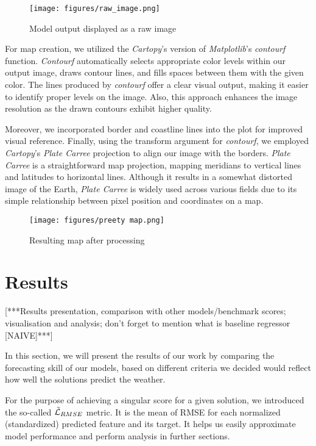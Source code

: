 \begin{figure}[!ht]
    \centering
    \texttt{[image: figures/raw\_image.png]}
    \caption{Model output displayed as a raw image}
    \label{fig:raw_image}
\end{figure}

For map creation, we utilized the \textit{Cartopy}’s version of \textit{Matplotlib}’s \textit{contourf} function. \textit{Contourf} automatically selects appropriate color levels within our output image, draws contour lines, and fills spaces between them with the given color. The lines produced by \textit{contourf} offer a clear visual output, making it easier to identify proper levels on the image. Also, this approach enhances the image resolution as the drawn contours exhibit higher quality.

Moreover, we incorporated border and coastline lines into the plot for improved visual reference. Finally, using the transform argument for \textit{contourf}, we employed \textit{Cartopy}’s \textit{Plate Carree} projection to align our image with the borders. \textit{Plate Carree} is a straightforward map projection, mapping meridians to vertical lines and latitudes to horizontal lines. Although it results in a somewhat distorted image of the Earth, \textit{Plate Carree} is widely used across various fields due to its simple relationship between pixel position and coordinates on a map.

\begin{figure}[!ht]
    \centering
    \texttt{[image: figures/preety map.png]}
    \caption{Resulting map after processing}
    \label{fig:pretty_map}
\end{figure}

\section{Results} \label{results}
[***Results presentation, comparison with other models/benchmark scores; visualisation and analysis; don't forget to mention what is baseline regressor [NAIVE]***]

In this section, we will present the results of our work by comparing the forecasting skill of our models, based on different criteria we decided would reflect how well the solutions predict the weather.

For the purpose of achieving a singular score for a given solution, we introduced the so-called $\Tilde{\mathcal{L}}_{RMSE}$ metric. It is the mean of RMSE for each normalized (standardized) predicted feature and its target. It helps us easily approximate model performance and perform analysis in further sections.

